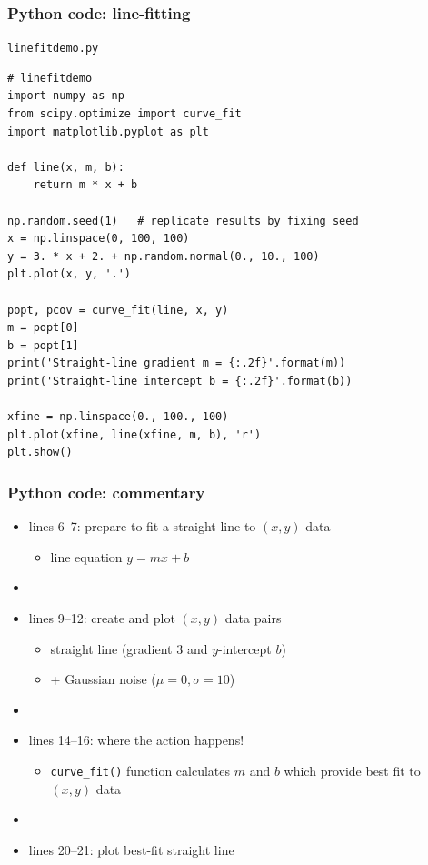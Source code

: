 \documentclass[english,14pt]{beamer}
\begin{document}

\begin{frame}[fragile]

\frametitle{Python code: line-fitting}

\vspace*{-3mm}

\texttt{linefitdemo.py}
\vspace*{-2mm}
\begin{lstlisting}[style=CStyle,basicstyle=\scriptsize]
# linefitdemo
import numpy as np
from scipy.optimize import curve_fit
import matplotlib.pyplot as plt

def line(x, m, b):
    return m * x + b

np.random.seed(1)   # replicate results by fixing seed
x = np.linspace(0, 100, 100)
y = 3. * x + 2. + np.random.normal(0., 10., 100)
plt.plot(x, y, '.')

popt, pcov = curve_fit(line, x, y)
m = popt[0]
b = popt[1]
print('Straight-line gradient m = {:.2f}'.format(m))
print('Straight-line intercept b = {:.2f}'.format(b))

xfine = np.linspace(0., 100., 100)
plt.plot(xfine, line(xfine, m, b), 'r')
plt.show()
\end{lstlisting}

\end{frame}


\begin{frame}[fragile]

\frametitle{Python code: commentary}

\begin{itemize}
	\item lines 6--7: prepare to fit a straight line to $(x,y)$ data
	\begin{itemize}
		\item line equation $y = mx + b$
	\end{itemize}
	\item[]
	\item lines 9--12: create and plot $(x,y)$ data pairs
	\begin{itemize}
		\item straight line (gradient $3$ and $y$-intercept $b$)
		\item[] + Gaussian noise ($\mu=0, \sigma=10$)
	\end{itemize}
	\item[]
	\item lines 14--16: where the action happens!
	\begin{itemize}
		\item \texttt{curve\_fit()} function calculates $m$ and $b$ which provide best fit to $(x,y)$ data
	\end{itemize}
	\item[]
	\item lines 20--21: plot best-fit straight line
\end{itemize}

\end{frame}
\end{document}
